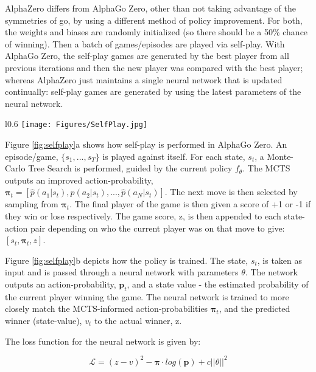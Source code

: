 \documentclass[12pt]{article}
\newcommand{\loss}{\mathcal{L}}
\begin{document}
AlphaZero differs from AlphaGo Zero, other than not taking advantage of the symmetries of go, by using a different method of policy improvement. For both, the weights and biases are randomly initialized (so there should be a 50\% chance of winning). Then a batch of games/episodes are played via self-play. With AlphaGo Zero, the self-play games are generated by the best player from all previous iterations and then the new player was compared with the best player; whereas AlphaZero just maintains a single neural network that is updated continually: self-play games are generated by using the latest parameters of the neural network. \cite{AlphaZero}

\begin{wrapfigure}{l}{0.6\textwidth}
   \centering
   \texttt{[image: Figures/SelfPlay.jpg]}
   \caption{A schematic showing how self-play and policy training are performed. Taken from \cite{AlphaGoZero}.}
   \label{fig:selfplay} 
\end{wrapfigure}

Figure \ref{fig:selfplay}a 
shows how self-play is performed in AlphaGo Zero. An episode/game, $\{s_1, ..., s_T\}$ is played against itself. For each state, $s_t$, a Monte-Carlo Tree Search is performed, guided by the current policy $f_\theta$. The MCTS outputs an improved action-probability, $\boldsymbol{\pi}_t = [\hat{p}(a_1|s_t), \hat{p}(a_2|s_t), ..., \hat{p}(a_N|s_t)]$. The next move is then selected by sampling from $\boldsymbol{\pi}_t$. The final player of the game is then given a score of +1 or -1 if they win or lose respectively. The game score, z, is then appended to each state-action pair depending on who the current player was on that move to give: $[s_t, \boldsymbol{\pi}_t, z]$. 

Figure \ref{fig:selfplay}b
depicts how the policy is trained. The state, $s_t$, is taken as input and is passed through a neural network with parameters $\theta$. The network outputs an action-probability, $\boldsymbol{p}_t$, and a state value - the estimated probability of the current player winning the game. The neural network is trained to more closely match the MCTS-informed action-probabilities $\boldsymbol{\pi}_t$, and the predicted winner (state-value), $v_t$ to the actual winner, z.

The loss function for the neural network is given by:

\begin{equation}
   \loss = (z - v)^2 - \boldsymbol{\pi} \cdot log(\boldsymbol{p}) + c||\theta||^2
   \label{eqn:loss}
\end{equation}
\end{document}
